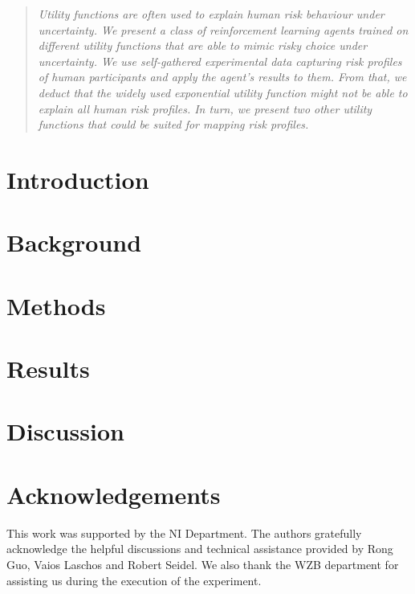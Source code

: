 \documentclass{article}
\begin{document}
\printAffiliationsAndNotice{\icmlEqualContribution} %

\begin{abstract}
\textit{Utility functions are often used to explain human risk behaviour under uncertainty. We present a class of reinforcement learning agents trained on different utility functions that are able to mimic risky choice under uncertainty. We use self-gathered experimental data capturing risk profiles of human participants and apply the agent's results to them. From that, we deduct that the widely used exponential utility function might not be able to explain all human risk profiles. In turn, we present two other utility functions that could be suited for mapping risk profiles.}
\end{abstract}

\section{Introduction}\label{sec:introduction}

\section{Background}\label{sec:background}

\section{Methods}\label{sec:methods}


\section{Results}\label{sec:results}

\section{Discussion}\label{sec:discussion}


\section*{Acknowledgements}

This work was supported by the NI Department. The authors gratefully acknowledge the helpful discussions and technical assistance provided by Rong Guo, Vaios Laschos and Robert Seidel.
We also thank the WZB department for assisting us during the execution of the experiment.
\end{document}
